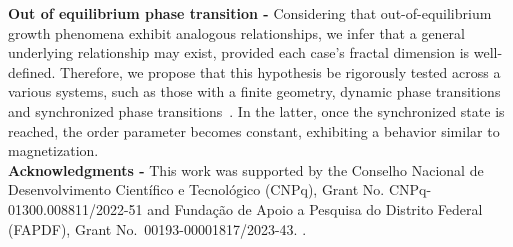 \documentclass[pre,aps,twocolumn,showpacs,floatfix,nofootinbib,superscriptaddress,linenumbers]{revtex4-1}
\begin{document}
{\bf Out of equilibrium phase transition -} Considering that out-of-equilibrium growth phenomena exhibit analogous relationships, we infer that a general underlying relationship may exist, provided each case's fractal dimension is well-defined. Therefore, we propose that this hypothesis be rigorously tested across a various systems, such as those with a finite geometry\cite{GomesFilho20,Kalosakas22,salman24}, dynamic phase transitions~\cite{Ziff86,Fernandes18,Santos24} and synchronized phase transitions~\cite{Kuramoto84,Pinto16,Pinto17,Gutierrez24,GUTIERREZ25}. In the latter, once the synchronized state is reached, the order parameter becomes constant, exhibiting a behavior similar to magnetization\cite{Kuramoto84}.\\


{\bf Acknowledgments -} This work was supported by 
the Conselho Nacional de Desenvolvimento Cient\'{i}fico e Tecnol\'{o}gico (CNPq), Grant No.  CNPq-01300.008811/2022-51  and Funda\c{c}\~ao de Apoio a Pesquisa do Distrito Federal (FAPDF), Grant No.\ 00193-00001817/2023-43. . 

\newpage



\end{document}
